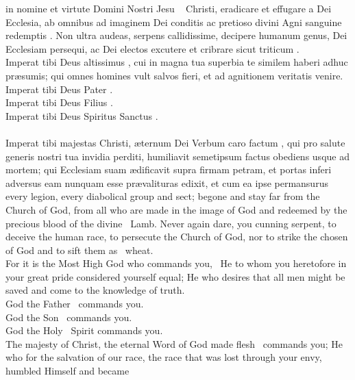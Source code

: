 \begin{multicols}{2}
\noindent in nomine et virtute Domini Nostri Jesu \grecross~ Christi, eradicare et effugare a Dei Ecclesia, ab omnibus ad imaginem Dei conditis ac pretioso divini Agni sanguine redemptis \grecross. Non ultra audeas, serpens callidissime, decipere humanum ge\-nus, Dei Ecclesiam persequi, ac Dei electos excutere et cribrare sicut triticum \grecross.\\
Imperat tibi Deus altissimus \grecross, cui in magna tua superbia te similem haberi adhuc pr\ae sumis; qui omnes homines vult salvos fieri, et ad agnitionem veritatis venire.\\Imperat tibi Deus Pater \grecross.\\ Imperat tibi Deus Filius \grecross.\\ Imperat tibi Deus Spiritus Sanctus \grecross.\\ \\Imperat tibi majestas Christi, \ae ternum Dei Verbum caro factum \grecross, qui pro salute generis nostri tua invidia perditi, humiliavit semetipsum factus obediens usque ad mortem; qui Ecclesiam suam \ae dificavit supra firmam petram, et portas inferi adversus eam nunquam esse pr\ae valituras edixit, et cum ea ipse permansurus\\
every legion, every diabolical group and sect; begone and stay far from the Church of God, from all who are made in the image of God and redeemed by the precious blood of the divine \grecross~Lamb. Never again dare, you cunning serpent, to deceive the human race, to persecute the Church of God, nor to strike the chosen of God and to sift them as \grecross~wheat.\\ For it is the Most High God who commands you, \grecross~He to whom you heretofore in your great pride considered yourself equal; He who desires that all men might be saved and come to the knowledge of truth.\\ God the Father \grecross~commands you.\\ God the Son \grecross~commands you.\\ God the Holy \grecross~Spirit commands you.\\ The majesty of Christ, the eternal Word of God made flesh \grecross~commands you; He who for the salvation of our race, the race that was lost through your envy, humbled Himself and became \\
\end{multicols}
